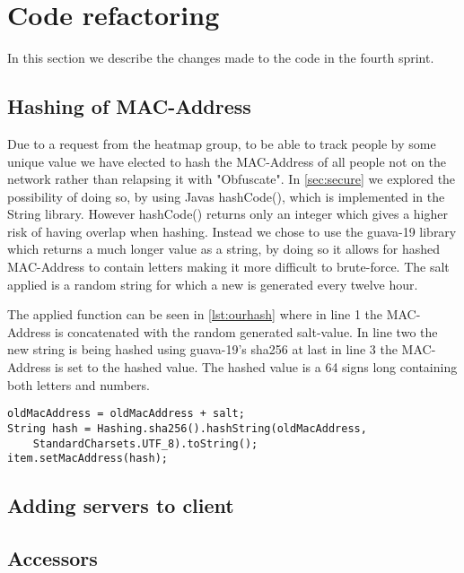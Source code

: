\section{Code refactoring}
In this section we describe the changes made to the code in the fourth sprint.

\subsection*{Hashing of MAC-Address}
Due to a request from the heatmap group, to be able to track people by some unique value we have elected to hash the MAC-Address of all people not on the network rather than relapsing it with "Obfuscate". In \cref{sec:secure} we explored the possibility of doing so, by using Javas hashCode(), which is implemented in the String library. However hashCode() returns only an integer which gives a higher risk of having overlap when hashing. Instead we chose to use the guava-19 library which returns a much longer value as a string, by doing so it allows for hashed MAC-Address to contain letters making it more difficult to brute-force. The salt applied is a random string for which a new is generated every twelve hour. 

The applied function can be seen in \cref{lst:ourhash} where in line 1 the MAC-Address is concatenated with the random generated salt-value. In line two the new string is being hashed using guava-19's sha256 at last in line 3 the MAC-Address is set to the hashed value. The hashed value is a 64 signs long containing both letters and numbers.

\begin{lstlisting}[caption={Hashing a MAC-Address},label={lst:ourhash},language=inc_Java]
oldMacAddress = oldMacAddress + salt;
String hash = Hashing.sha256().hashString(oldMacAddress, 
	StandardCharsets.UTF_8).toString();
item.setMacAddress(hash);
\end{lstlisting}

\subsection*{Adding servers to client}

\subsection*{Accessors}